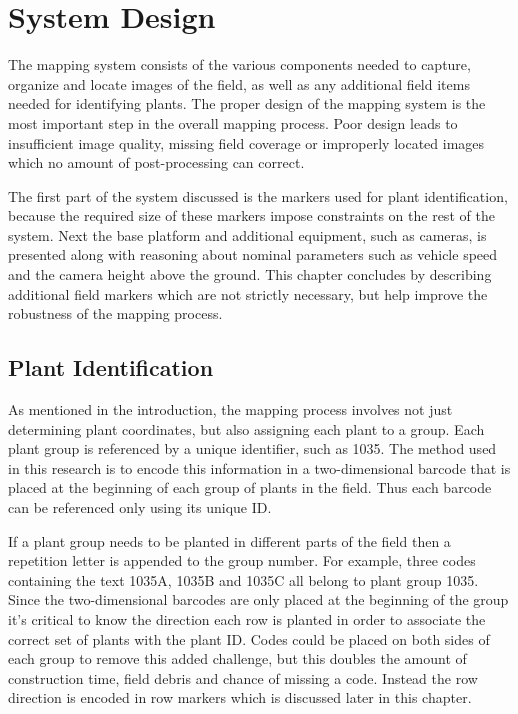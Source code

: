 
\cleardoublepage

\chapter{System Design}
\label{chapter:system_design}

The mapping system consists of the various components needed to capture, organize and locate images of the field, as well as any additional field items needed for identifying plants.  The proper design of the mapping system is the most important step in the overall mapping process.  Poor design leads to insufficient image quality, missing field coverage or improperly located images which no amount of post-processing can correct.  

The first part of the system discussed is the markers used for plant identification, because the required size of these markers impose constraints on the rest of the system.  Next the base platform and additional equipment, such as cameras, is presented along with reasoning about nominal parameters such as vehicle speed and the camera height above the ground.  This chapter concludes by describing additional field markers which are not strictly necessary, but help improve the robustness of the mapping process. 

\section{Plant Identification}
\label{section:plantid}

As mentioned in the introduction, the mapping process involves not just determining plant coordinates, but also assigning each plant to a group.  Each plant group is referenced by a unique identifier, such as 1035.  The method used in this research is to encode this information in a two-dimensional barcode that is placed at the beginning of each group of plants in the field.  Thus each barcode can be referenced only using its unique ID.  

If a plant group needs to be planted in different parts of the field then a repetition letter is appended to the group number.  For example, three codes containing the text 1035A, 1035B and 1035C all belong to plant group 1035.  Since the two-dimensional barcodes are only placed at the beginning of the group it's critical to know the direction each row is planted in order to associate the correct set of plants with the plant ID.  Codes could be placed on both sides of each group to remove this added challenge, but this doubles the amount of construction time, field debris and chance of missing a code.  Instead the row direction is encoded in row markers which is discussed later in this chapter.

